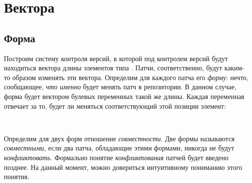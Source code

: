 \section{Вектора}


\subsection{Форма}

Построим систему контроля версий, в которой под контролем версий будут
находиться вектора длины  элементов типа .
Патчи, соответственно, будут каким-то образом изменять эти вектора.
Определим для каждого патча его \emph{форму}: нечто, сообщающее,
\emph{что именно} будет менять патч в репозитории. В данном случае,
форма будет вектором булевых переменных такой же длины. Каждая
переменная отвечает за то, будет ли меняться соответствующий этой
позиции элемент:

\begin{code}%
\>[0]\<[2]%
\>[2] \AgdaSymbol{:}   \<%
\\
\>[0]\<[2]%
\>[2] \AgdaSymbol{=}   \<%
\end{code}

Определим для двух форм отношение \emph{совместности}. Две формы
называются \emph{совместными}, если два патча, обладающие этими
формами, никогда не будут \emph{конфликтовать}. Формально понятие
\emph{конфликтования} патчей будет введено позднее. На данный момент,
можно довериться интуитивному пониманию этого понятия.

